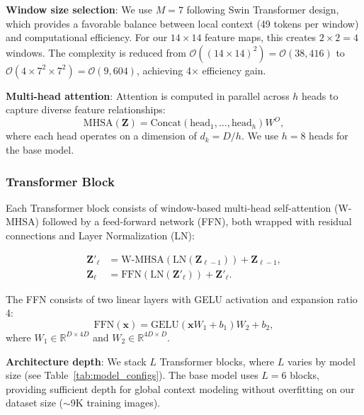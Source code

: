 \textbf{Window size selection}: We use $M = 7$ following Swin Transformer design, which provides a favorable balance between local context (49 tokens per window) and computational efficiency. For our $14 \times 14$ feature maps, this creates $2 \times 2 = 4$ windows. The complexity is reduced from $\mathcal{O}((14 \times 14)^2) = \mathcal{O}(38{,}416)$ to $\mathcal{O}(4 \times 7^2 \times 7^2) = \mathcal{O}(9{,}604)$, achieving 4$\times$ efficiency gain.

\textbf{Multi-head attention}: Attention is computed in parallel across $h$ heads to capture diverse feature relationships:
\begin{equation}
\mathrm{MHSA}(\mathbf{Z}) = \mathrm{Concat}(\mathrm{head}_1, \dots, \mathrm{head}_h)W^O,
\end{equation}
where each head operates on a dimension of $d_k = D/h$. We use $h=8$ heads for the base model.

\subsubsection{Transformer Block}

Each Transformer block consists of window-based multi-head self-attention (W-MHSA) followed by a feed-forward network (FFN), both wrapped with residual connections and Layer Normalization (LN):

\begin{align}
\mathbf{Z}'_\ell &= \text{W-MHSA}(\text{LN}(\mathbf{Z}_{\ell-1})) + \mathbf{Z}_{\ell-1}, \\
\mathbf{Z}_\ell &= \text{FFN}(\text{LN}(\mathbf{Z}'_\ell)) + \mathbf{Z}'_\ell.
\end{align}

The FFN consists of two linear layers with GELU activation and expansion ratio 4:
\begin{equation}
\mathrm{FFN}(\mathbf{x}) = \mathrm{GELU}(\mathbf{x}W_1 + b_1)W_2 + b_2,
\end{equation}
where $W_1 \in \mathbb{R}^{D \times 4D}$ and $W_2 \in \mathbb{R}^{4D \times D}$.

\textbf{Architecture depth}: We stack $L$ Transformer blocks, where $L$ varies by model size (see Table~\ref{tab:model_configs}). The base model uses $L=6$ blocks, providing sufficient depth for global context modeling without overfitting on our dataset size ($\sim$9K training images).

